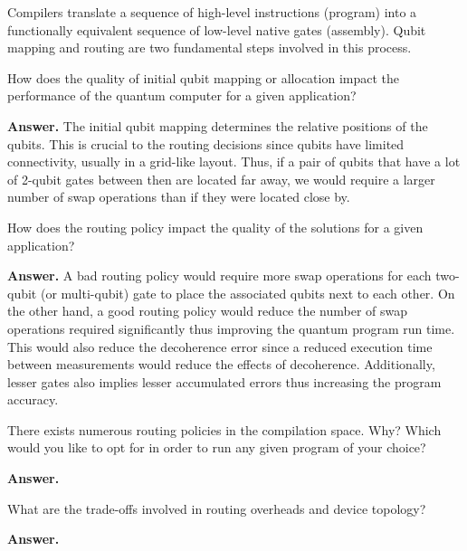 Compilers translate a sequence of high-level instructions (program) into a functionally equivalent sequence of low-level native gates (assembly). Qubit mapping and routing are two fundamental steps involved in this process.

\tcbline{}

\begin{question}
    How does the quality of initial qubit mapping or allocation impact the performance of the quantum computer for a given application?
\end{question}
\textbf{Answer.} The initial qubit mapping determines the relative positions of the qubits. This is crucial to the routing decisions since qubits have limited connectivity, usually in a grid-like layout. Thus, if a pair of qubits that have a lot of 2-qubit gates between then are located far away, we would require a larger number of swap operations than if they were located close by.

\tcbline{}

\begin{question}
    How does the routing policy impact the quality of the solutions for a given application?
\end{question}
\textbf{Answer.} A bad routing policy would require more swap operations for each two-qubit (or multi-qubit) gate to place the associated qubits next to each other. On the other hand, a good routing policy would reduce the number of swap operations required significantly thus improving the quantum program run time. This would also reduce the decoherence error since a reduced execution time between measurements would reduce the effects of decoherence. Additionally, lesser gates also implies lesser accumulated errors thus increasing the program accuracy.

\tcbline{}

\begin{question}
    There exists numerous routing policies in the compilation space. Why? Which would you like to opt for in order to run any given program of your choice?
\end{question}
\textbf{Answer.} %

\tcbline{}

\begin{question}
    What are the trade-offs involved in routing overheads and device topology?
\end{question}
\textbf{Answer.} %